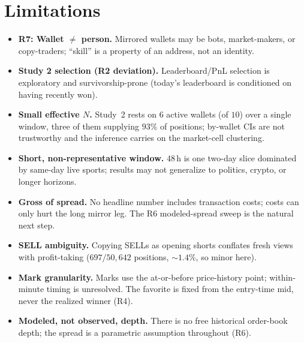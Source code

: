 \documentclass[11pt]{article}
\begin{document}
\section{Limitations}
\begin{itemize}\itemsep2pt
\item \textbf{R7: Wallet $\neq$ person.} Mirrored wallets may be bots, market-makers, or
copy-traders; ``skill'' is a property of an address, not an identity.
\item \textbf{Study 2 selection (R2 deviation).} Leaderboard/PnL selection is exploratory and
survivorship-prone (today's leaderboard is conditioned on having recently won).
\item \textbf{Small effective $N$.} Study~2 rests on $6$ active wallets (of $10$) over a single
window, three of them supplying $93\%$ of positions; by-wallet CIs are not trustworthy and the
inference carries on the market-cell clustering.
\item \textbf{Short, non-representative window.} $48$\,h is one two-day slice dominated by
same-day live sports; results may not generalize to politics, crypto, or longer horizons.
\item \textbf{Gross of spread.} No headline number includes transaction costs; costs can only
hurt the long mirror leg. The R6 modeled-spread sweep is the natural next step.
\item \textbf{SELL ambiguity.} Copying SELLs as opening shorts conflates fresh views with
profit-taking ($697/50{,}642$ positions, ${\sim}1.4\%$, so minor here).
\item \textbf{Mark granularity.} Marks use the at-or-before price-history point; within-minute
timing is unresolved. The favorite is fixed from the entry-time mid, never the realized winner
(R4).
\item \textbf{Modeled, not observed, depth.} There is no free historical order-book depth; the
spread is a parametric assumption throughout (R6).
\end{itemize}

\end{document}
